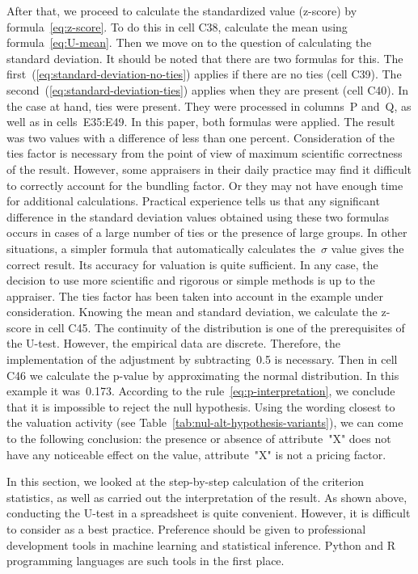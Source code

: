 \documentclass[]{scrreprt}
\begin{document}
After that, we proceed to calculate the standardized value (z-score) by formula~\ref{eq:z-score}. To do this in cell C38, calculate the mean using formula~\ref{eq:U-mean}. Then we move on to the question of calculating the standard deviation. It should be noted that there are two formulas for this. The first~(\ref{eq:standard-deviation-no-ties}) applies if there are no ties (cell C39). The second~(\ref{eq:standard-deviation-ties}) applies when they are present (cell C40). In the case at hand, ties were present. They were processed in columns~P and~Q, as well as in cells~E35:E49. In this paper, both formulas were applied. The result was two values with a difference of less than one percent. Consideration of the ties factor is necessary from the point of view of maximum scientific correctness of the result. However, some appraisers in their daily practice may find it difficult to correctly account for the bundling factor. Or they may not have enough time for additional calculations. Practical experience tells us that any significant difference in the standard deviation values obtained using these two formulas occurs in cases of a large number of ties or the presence of large groups. In other situations, a simpler formula that automatically calculates the~${\sigma}$ value gives the correct result. Its accuracy for valuation is quite sufficient. In any case, the decision to use more scientific and rigorous or simple methods is up to the appraiser. The ties factor has been taken into account in the example under consideration. Knowing the mean and standard deviation, we calculate the z-score in cell C45. The continuity of the distribution is one of the prerequisites of the U-test. However, the empirical data are discrete. Therefore, the implementation of the adjustment by subtracting~0.5 is necessary. Then in cell C46 we calculate the p-value by approximating the normal distribution. In this example it was~0.173. According to the rule~\ref{eq:p-interpretation}, we conclude that it is impossible to reject the null hypothesis. Using the wording closest to the valuation activity (see Table~\ref{tab:nul-alt-hypothesis-variants}), we can come to the following conclusion: the presence or absence of attribute~"X" does not have any noticeable effect on the value, attribute~"X" is not a pricing factor.

In this section, we looked at the step-by-step calculation of the criterion statistics, as well as carried out the interpretation of the result. As shown above, conducting the U-test in a spreadsheet is quite convenient. However, it is difficult to consider as a best practice. Preference should be given to professional development tools in machine learning and statistical inference. Python and R programming languages are such tools in the first place.
%
\clearpage
%
\end{document}

